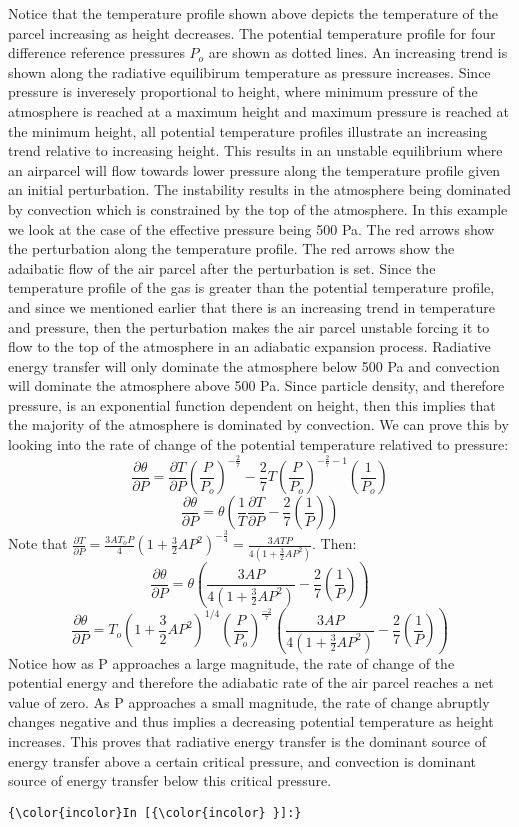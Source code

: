 \documentclass[11pt]{article}
\begin{document}
    Notice that the temperature profile shown above depicts the temperature
of the parcel increasing as height decreases. The potential temperature
profile for four difference reference pressures \(P_o\) are shown as
dotted lines. An increasing trend is shown along the radiative
equilibirum temperature as pressure increases. Since pressure is
inveresely proportional to height, where minimum pressure of the
atmosphere is reached at a maximum height and maximum pressure is
reached at the minimum height, all potential temperature profiles
illustrate an increasing trend relative to increasing height. This
results in an unstable equilibrium where an airparcel will flow towards
lower pressure along the temperature profile given an initial
perturbation. The instability results in the atmosphere being dominated
by convection which is constrained by the top of the atmosphere. In this
example we look at the case of the effective pressure being 500 Pa. The
red arrows show the perturbation along the temperature profile. The red
arrows show the adaibatic flow of the air parcel after the perturbation
is set. Since the temperature profile of the gas is greater than the
potential temperature profile, and since we mentioned earlier that there
is an increasing trend in temperature and pressure, then the
perturbation makes the air parcel unstable forcing it to flow to the top
of the atmosphere in an adiabatic expansion process. Radiative energy
transfer will only dominate the atmosphere below 500 Pa and convection
will dominate the atmosphere above 500 Pa. Since particle density, and
therefore pressure, is an exponential function dependent on height, then
this implies that the majority of the atmosphere is dominated by
convection. We can prove this by looking into the rate of change of the
potential temperature relatived to pressure:
\[\frac{\partial \theta}{\partial P} = \frac{\partial T}{\partial P}\left( \frac{P}{P_o}\right)^{-\frac{2}{7}} - \frac{2}{7}T \left( \frac{P}{P_o}\right)^{-\frac{2}{7} - 1}(\frac{1}{P_o})\]
\[\frac{\partial \theta}{\partial P} = \theta \left( \frac{1}{T}\frac{\partial T}{\partial P} - \frac{2}{7}(\frac{1}{P}) \right)\]
Note that
\(\frac{\partial T}{\partial P} = \frac{3A T_o P}{4}(1 + \frac{3}{2}AP^2)^{-\frac{3}{4}} = \frac{3A T P}{4(1 + \frac{3}{2}AP^2)}\).
Then:
\[\frac{\partial \theta}{\partial P} = \theta \left( \frac{3A P}{4(1 + \frac{3}{2}AP^2)} - \frac{2}{7}(\frac{1}{P}) \right)\]
\[\frac{\partial \theta}{\partial P} = T_o(1 + \frac{3}{2} AP^2)^{1/4} \left(\frac{P}{P_o}\right)^{\frac{-2}{7}} \left( \frac{3A P}{4(1 + \frac{3}{2}AP^2)} - \frac{2}{7}(\frac{1}{P}) \right)
\] Notice how as P approaches a large magnitude, the rate of change of
the potential energy and therefore the adiabatic rate of the air parcel
reaches a net value of zero. As P approaches a small magnitude, the rate
of change abruptly changes negative and thus implies a decreasing
potential temperature as height increases. This proves that radiative
energy transfer is the dominant source of energy transfer above a
certain critical pressure, and convection is dominant source of energy
transfer below this critical pressure.

    \begin{Verbatim}[commandchars=\\\{\}]
{\color{incolor}In [{\color{incolor} }]:} 
\end{Verbatim}


    
    
    
    
\end{document}
